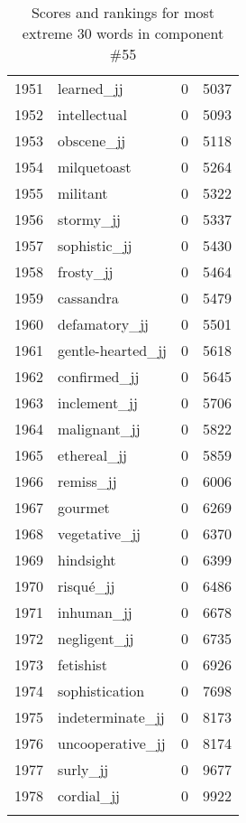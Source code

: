 \begin{longtable}[!htbp]{| rlr@{.}l |}
    1951 & learned\_jj & 0 & 5037 \\
    1952 & intellectual & 0 & 5093 \\
    1953 & obscene\_jj & 0 & 5118 \\
    1954 & milquetoast & 0 & 5264 \\
    1955 & militant & 0 & 5322 \\
    1956 & stormy\_jj & 0 & 5337 \\
    1957 & sophistic\_jj & 0 & 5430 \\
    1958 & frosty\_jj & 0 & 5464 \\
    1959 & cassandra & 0 & 5479 \\
    1960 & defamatory\_jj & 0 & 5501 \\
    1961 & gentle-hearted\_jj & 0 & 5618 \\
    1962 & confirmed\_jj & 0 & 5645 \\
    1963 & inclement\_jj & 0 & 5706 \\
    1964 & malignant\_jj & 0 & 5822 \\
    1965 & ethereal\_jj & 0 & 5859 \\
    1966 & remiss\_jj & 0 & 6006 \\
    1967 & gourmet & 0 & 6269 \\
    1968 & vegetative\_jj & 0 & 6370 \\
    1969 & hindsight & 0 & 6399 \\
    1970 & risqué\_jj & 0 & 6486 \\
    1971 & inhuman\_jj & 0 & 6678 \\
    1972 & negligent\_jj & 0 & 6735 \\
    1973 & fetishist & 0 & 6926 \\
    1974 & sophistication & 0 & 7698 \\
    1975 & indeterminate\_jj & 0 & 8173 \\
    1976 & uncooperative\_jj & 0 & 8174 \\
    1977 & surly\_jj & 0 & 9677 \\
    1978 & cordial\_jj & 0 & 9922 \\
    \hline
    \caption{Scores and rankings for most extreme 30 words in component \#55} \\
\end{longtable}
